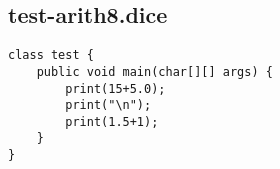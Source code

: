 \subsection{test-arith8.dice}
\begin{verbatim}
class test {
	public void main(char[][] args) {
		print(15+5.0);
		print("\n");
		print(1.5+1);
	}
}

\end{verbatim}